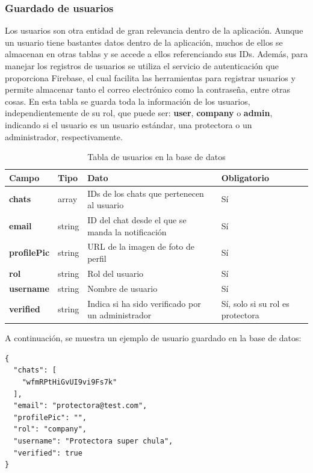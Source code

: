 \documentclass[a4paper, 12pt]{article}
\begin{document}
\subsubsection{Guardado de usuarios}

Los usuarios son otra entidad de gran relevancia dentro de la aplicación. Aunque un usuario tiene bastantes datos dentro de la aplicación, muchos de ellos se almacenan en otras tablas y se accede a ellos referenciando sus IDs. Además, para manejar los registros de usuarios se utiliza el servicio de autenticación que proporciona Firebase, el cual facilita las herramientas para registrar usuarios y permite almacenar tanto el correo electrónico como la contraseña, entre otras cosas. En esta tabla se guarda toda la información de los usuarios, independientemente de su rol, que puede ser: \textbf{user}, \textbf{company} o \textbf{admin}, indicando si el usuario es un usuario estándar, una protectora o un administrador, respectivamente.

\begin{table}[H]
\label{tab:requests}
	\begin{tabular}{|m{3.2cm}|m{2cm}|m{5cm}|m{3cm}|}
	\hline
	\textbf{Campo} & \textbf{Tipo} & \textbf{Dato} & \textbf{Obligatorio} \\ 
	\hline
	\textbf{chats} & array & IDs de los chats que pertenecen al usuario &  Sí \\ 
	\hline
	\textbf{email} & string &  ID del chat desde el que se manda la notificación &  Sí \\ 
	\hline
	\textbf{profilePic} & string & URL de la imagen de foto de perfil & Sí \\ 
	\hline
	\textbf{rol} & string & Rol del usuario & Sí \\ 
	\hline
	\textbf{username} & string & Nombre de usuario & Sí \\ 
	\hline
	\textbf{verified} & string & Indica si ha sido verificado por un administrador & Sí, solo si su rol es protectora \\ 
	\hline
	\end{tabular}
\caption{Tabla de usuarios en la base de datos}
\end{table}



A continuación, se muestra un ejemplo de usuario guardado en la base de datos:

\begin{verbatim}
{
  "chats": [
    "wfmRPtHiGvUI9vi9Fs7k"
  ],
  "email": "protectora@test.com",
  "profilePic": "",
  "rol": "company",
  "username": "Protectora super chula",
  "verified": true
}
\end{verbatim}
\end{document}
